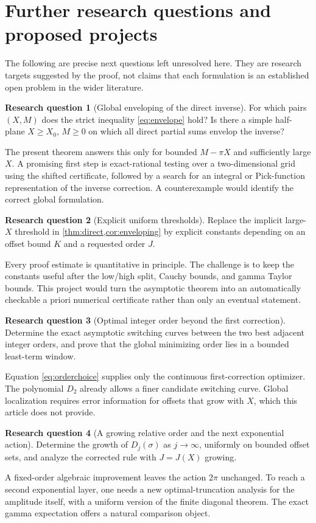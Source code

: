 \documentclass[11pt,a4paper]{article}
\theoremstyle{definition}
\newtheorem{problem}{Research question}
\numberwithin{equation}{section}
\begin{document}
\section{Further research questions and proposed projects}
\label{sec:questions}

The following are precise next questions left unresolved here. They are research targets suggested by the proof, not claims that each formulation is an established open problem in the wider literature.

\begin{problem}[Global enveloping of the direct inverse]
For which pairs $(X,M)$ does the strict inequality \eqref{eq:envelope} hold? Is there a simple half-plane $X\ge X_0$, $M\ge0$ on which all direct partial sums envelop the inverse?
\end{problem}
The present theorem answers this only for bounded $M-\pi X$ and sufficiently large $X$. A promising first step is exact-rational testing over a two-dimensional grid using the shifted certificate, followed by a search for an integral or Pick-function representation of the inverse correction. A counterexample would identify the correct global formulation.

\begin{problem}[Explicit uniform thresholds]
Replace the implicit large-$X$ threshold in \cref{thm:direct,cor:enveloping} by explicit constants depending on an offset bound $K$ and a requested order $J$.
\end{problem}
Every proof estimate is quantitative in principle. The challenge is to keep the constants useful after the low/high split, Cauchy bounds, and gamma Taylor bounds. This project would turn the asymptotic theorem into an automatically checkable a priori numerical certificate rather than only an eventual statement.

\begin{problem}[Optimal integer order beyond the first correction]
Determine the exact asymptotic switching curves between the two best adjacent integer orders, and prove that the global minimizing order lies in a bounded least-term window.
\end{problem}
Equation \eqref{eq:orderchoice} supplies only the continuous first-correction optimizer. The polynomial $D_2$ already allows a finer candidate switching curve. Global localization requires error information for offsets that grow with $X$, which this article does not provide.

\begin{problem}[A growing relative order and the next exponential action]
Determine the growth of $D_j(\sigma)$ as $j\to\infty$, uniformly on bounded offset sets, and analyze the corrected rule with $J=J(X)$ growing.
\end{problem}
A fixed-order algebraic improvement leaves the action $2\pi$ unchanged. To reach a second exponential layer, one needs a new optimal-truncation analysis for the amplitude itself, with a uniform version of the finite diagonal theorem. The exact gamma expectation offers a natural comparison object.
\end{document}
